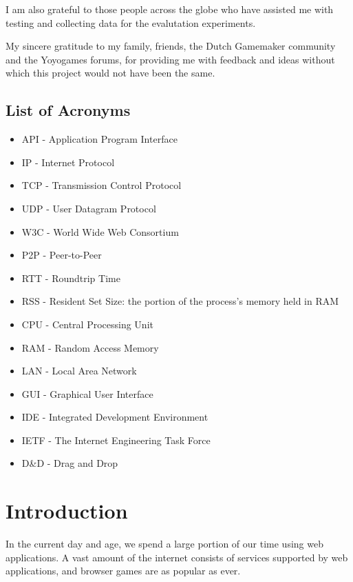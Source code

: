 \documentclass[bsc,frontabs,twoside,singlespacing,parskip,deptreport]{infthesis}     %
\begin{document}
I am also grateful to those people across the globe who have assisted me with testing and collecting data for the evalutation experiments.

My sincere gratitude to my family, friends, the Dutch Gamemaker community and the Yoyogames forums, for providing me with feedback and ideas without which this project would not have been the same.

\section*{List of Acronyms}
\begin{itemize}
\item API - Application Program Interface
\item IP - Internet Protocol
\item TCP - Transmission Control Protocol
\item UDP - User Datagram Protocol
\item W3C - World Wide Web Consortium
\item P2P - Peer-to-Peer
\item RTT - Roundtrip Time
\item RSS - Resident Set Size: the portion of the process's memory held in RAM
\item CPU - Central Processing Unit
\item RAM - Random Access Memory
\item LAN - Local Area Network
\item GUI - Graphical User Interface
\item IDE - Integrated Development Environment
\item IETF - The Internet Engineering Task Force
\item D\&D - Drag and Drop
\end{itemize}

\tableofcontents




\chapter{Introduction}
In the current day and age, we spend a large portion of our time using web applications. A vast amount of the internet consists of services supported by web applications, and browser games are as popular as ever.
\end{document}
